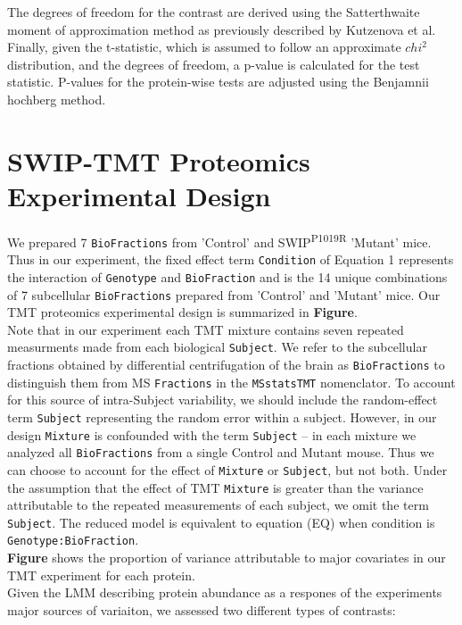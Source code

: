 \documentclass[11pt]{elife}\usepackage[]{graphicx}\usepackage[]{color}
\begin{document}
The degrees of freedom for the contrast are derived using the Satterthwaite
moment of approximation method as previously described by Kutzenova et al.
Finally, given the t-statistic, which is assumed to follow an approximate
$chi^2$ distribution, and the degrees of freedom, a p-value is calculated for
the test statistic.  P-values for the protein-wise tests are adjusted using the
Benjamnii hochberg method.\\


\section{SWIP-TMT Proteomics Experimental Design}

We prepared 7 \texttt{BioFractions} from 'Control' and 
SWIP\textsuperscript{P1019R} 'Mutant' mice. Thus in our experiment, 
the fixed effect term \texttt{Condition} of Equation 1 represents the interaction 
of \texttt{Genotype} and \texttt{BioFraction} and is the 14 unique combinations 
of 7 subcellular \texttt{BioFractions} prepared from 'Control' and 'Mutant' mice. 
Our TMT proteomics experimental design is
summarized in \textbf{Figure}.\\

Note that in our experiment each TMT mixture contains seven repeated measurments
made from each biological \texttt{Subject}. We refer to the subcellular
fractions obtained by differential centrifugation of the brain as
\texttt{BioFractions} to distinguish them from MS \texttt{Fractions} in the
\texttt{MSstatsTMT} nomenclator. To account for this source of
intra-Subject variability, we should include the random-effect term
\texttt{Subject} representing the random error within a subject. However, in our
design \texttt{Mixture} is confounded with the term \texttt{Subject} -- in
each mixture we analyzed all \texttt{BioFractions} from a single Control and
Mutant mouse.  Thus we can choose to account for the effect of \texttt{Mixture}
or \texttt{Subject}, but not both. Under the assumption that the effect of TMT
\texttt{Mixture} is greater than the variance attributable to the repeated
measurements of each subject, we omit the term \texttt{Subject}.  The reduced
model is equivalent  to equation (EQ) when condition is
\texttt{Genotype:BioFraction}.\\

\textbf{Figure} shows
the proportion of variance attributable to major covariates in our TMT
experiment for each protein. \\
Given the LMM describing protein abundance as a respones of the experiments
major sources of variaiton, we assessed two different types of contrasts:\\
\end{document}
